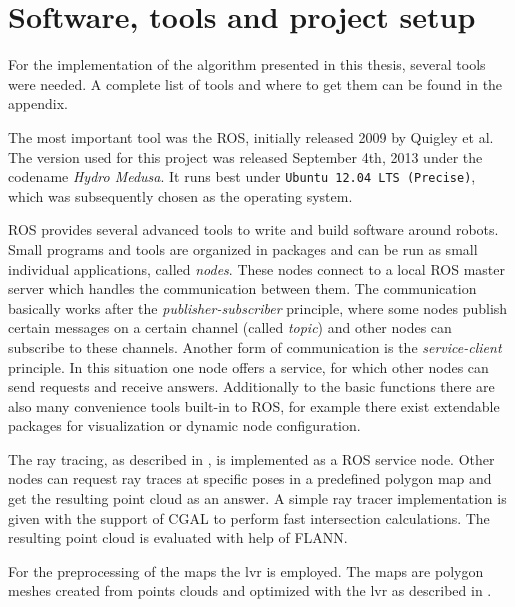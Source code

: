 \documentclass[Thesis.tex]{subfiles}
\begin{document}
\chapter{Software, tools and project setup}
For the implementation of the algorithm presented in this thesis, several tools were needed. A complete list of tools and where to get them can be found in the appendix.

\smallskip

The most important tool was the \gls{ROS}, initially released 2009 by Quigley et al.\cite{ros:2009} The version used for this project was released September 4th, 2013 under the codename \emph{Hydro Medusa}. It runs best under \texttt{Ubuntu 12.04 LTS (Precise)}, which was subsequently chosen as the operating system. 

\gls{ROS} provides several advanced tools to write and build software around robots. Small programs and tools are organized in packages and can be run as small individual applications, called \emph{nodes}. These nodes connect to a local \gls{ROS} master server which handles the communication between them. The communication basically works after the \emph{publisher-subscriber} principle, where some nodes publish certain messages on a certain channel (called \emph{topic}) and other nodes can subscribe to these channels.
Another form of communication is the \emph{service-client} principle. In this situation one node offers a service, for which other nodes can send requests and receive answers. Additionally to the basic functions there are also many convenience tools built-in to \gls{ROS}, for example there exist extendable packages for visualization or dynamic node configuration.

\smallskip

The ray tracing, as described in , is implemented as a \gls{ROS} service node. Other nodes can request ray traces at specific poses in a predefined polygon map and get the resulting point cloud as an answer. A simple ray tracer implementation is given with the support of \gls{CGAL} to perform fast intersection calculations. The resulting point cloud is evaluated with help of \gls{FLANN}. 

For the preprocessing of the maps the \gls{lvr} is employed. The maps are polygon meshes created from points clouds and optimized with the \gls{lvr} as described in \cite{Wiemann:2013}.
\end{document}
